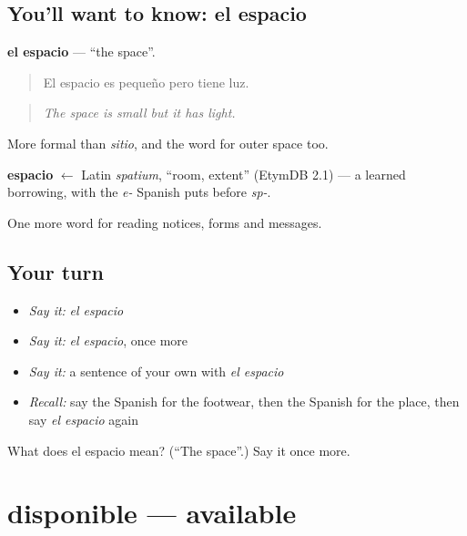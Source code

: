 \subsection*{You'll want to know: el espacio}
\textbf{el espacio} — \textquotedblleft{}the space\textquotedblright{}.

\begin{quote}
El espacio es pequeño pero tiene luz.
\end{quote}

\begin{quote}
\emph{The space is small but it has light.}
\end{quote}

More formal than \emph{sitio}, and the word for outer space too.

\begin{cousinweb}
\textbf{espacio} $\leftarrow$ Latin \emph{spatium}, \textquotedblleft{}room, extent\textquotedblright{} (EtymDB 2.1) — a learned borrowing, with the \emph{e-} Spanish puts before \emph{sp-}.
\end{cousinweb}

\begin{grammarlens}[title={What you've built}]
One more word for reading notices, forms and messages.
\end{grammarlens}

\subsection*{Your turn}
\begin{itemize}
\raggedright
  \item \emph{Say it:} \emph{el espacio}
  \item \emph{Say it:} \emph{el espacio}, once more
  \item \emph{Say it:} a sentence of your own with \emph{el espacio}
  \item \emph{Recall:} say the Spanish for the footwear, then the Spanish for the place, then say \emph{el espacio} again
\end{itemize}

\begin{tcolorbox}[breakable,colback=teal!4,colframe=teal!35!black,title={Before you move on}]
What does el espacio mean? (\textquotedblleft{}The space\textquotedblright{}.) Say it once more.
\end{tcolorbox}
\section[disponible]{disponible — available}

